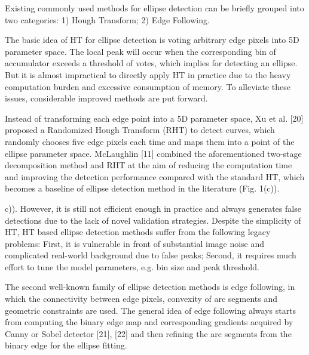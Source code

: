 \documentclass[a4paper]{report}
\begin{document}
Existing commonly used methods for ellipse detection can
be briefly grouped into two categories: 1) Hough Transform;
2) Edge Following.

The basic idea of HT for ellipse
detection is voting arbitrary edge pixels into 5D parameter
space. The local peak will occur when the corresponding bin
of accumulator exceeds a threshold of votes, which implies
for detecting an ellipse. But it is almost impractical to directly
apply HT in practice due to the heavy computation burden and
excessive consumption of memory. To alleviate these issues,
considerable improved methods are put forward.

Instead of transforming each edge point into
a 5D parameter space, Xu et al. [20] proposed a Randomized
Hough Transform (RHT) to detect curves, which randomly
chooses five edge pixels each time and maps them into a point
of the ellipse parameter space. McLaughlin [11] combined the
aforementioned two-stage decomposition method and RHT
at the aim of reducing the computation time and improving
the detection performance compared with the standard HT,
which becomes a baseline of ellipse detection method in the
literature (Fig. 1(c)).

c)). However, it is still not efficient enough in
practice and always generates false detections due to the lack
of novel validation strategies. Despite the simplicity of HT,
HT based ellipse detection methods suffer from the following
legacy problems: First, it is vulnerable in front of substantial
image noise and complicated real-world background due to
false peaks; Second, it requires much effort to tune the model
parameters, e.g. bin size and peak threshold.

The second well-known family of ellipse detection methods
is edge following, in which the connectivity between edge
pixels, convexity of arc segments and geometric constraints are
used. The general idea of edge following always starts from
computing the binary edge map and corresponding gradients
acquired by Canny or Sobel detector [21], [22] and then
refining the arc segments from the binary edge for the ellipse
fitting.
\end{document}
